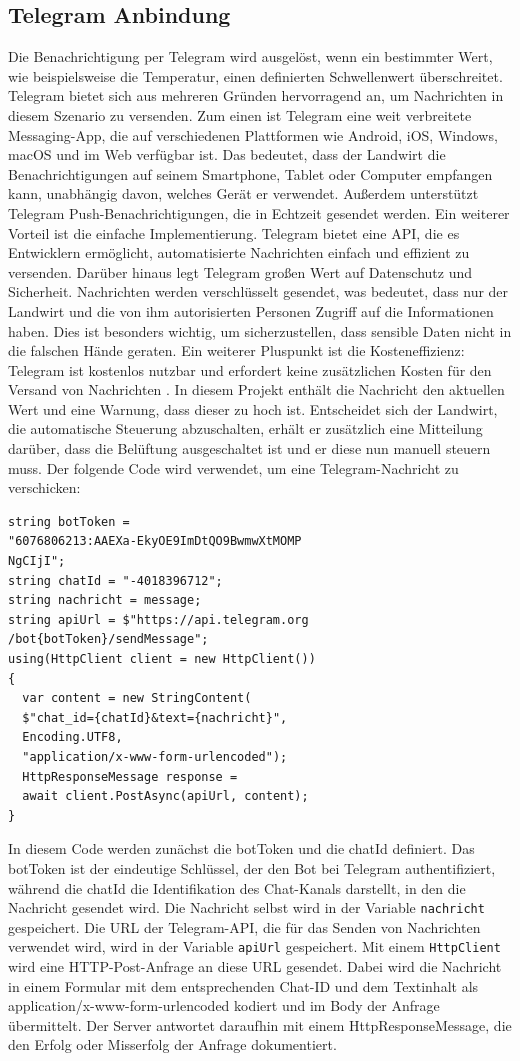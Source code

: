 \documentclass[conference]{IEEEtran}
\begin{document}
\subsection{Telegram Anbindung}
Die Benachrichtigung per Telegram wird ausgelöst, wenn ein bestimmter Wert, wie beispielsweise die Temperatur, einen definierten Schwellenwert überschreitet. Telegram bietet sich aus mehreren Gründen hervorragend an, um Nachrichten in diesem Szenario zu versenden. Zum einen ist Telegram eine weit verbreitete Messaging-App, die auf verschiedenen Plattformen wie Android, iOS, Windows, macOS und im Web verfügbar ist. Das bedeutet, dass der Landwirt die Benachrichtigungen auf seinem Smartphone, Tablet oder Computer empfangen kann, unabhängig davon, welches Gerät er verwendet. Außerdem unterstützt Telegram Push-Benachrichtigungen, die in Echtzeit gesendet werden. Ein weiterer Vorteil ist die einfache Implementierung. Telegram bietet eine API,  die es Entwicklern ermöglicht, automatisierte Nachrichten einfach und effizient zu versenden. Darüber hinaus legt Telegram großen Wert auf Datenschutz und Sicherheit. Nachrichten werden verschlüsselt gesendet, was bedeutet, dass nur der Landwirt und die von ihm autorisierten Personen Zugriff auf die Informationen haben. Dies ist besonders wichtig, um sicherzustellen, dass sensible Daten nicht in die falschen Hände geraten. Ein weiterer Pluspunkt ist die Kosteneffizienz: Telegram ist kostenlos nutzbar und erfordert keine zusätzlichen Kosten für den Versand von Nachrichten \cite{telegram}.
In diesem Projekt enthält die Nachricht den aktuellen Wert und eine Warnung, dass dieser zu hoch ist. Entscheidet sich der Landwirt, die automatische Steuerung abzuschalten, erhält er zusätzlich eine Mitteilung darüber, dass die Belüftung ausgeschaltet ist und er diese nun manuell steuern muss.
Der folgende Code wird verwendet, um eine Telegram-Nachricht zu verschicken:
\begin{verbatim}
string botToken = 
"6076806213:AAEXa-EkyOE9ImDtQO9BwmwXtMOMP
NgCIjI";
string chatId = "-4018396712";
string nachricht = message;
string apiUrl = $"https://api.telegram.org
/bot{botToken}/sendMessage";
using(HttpClient client = new HttpClient())
{
  var content = new StringContent(
  $"chat_id={chatId}&text={nachricht}", 
  Encoding.UTF8, 
  "application/x-www-form-urlencoded");
  HttpResponseMessage response = 
  await client.PostAsync(apiUrl, content);
}
\end{verbatim}
In diesem Code werden zunächst die botToken und die chatId definiert. Das botToken ist der eindeutige Schlüssel, der den Bot bei Telegram authentifiziert, während die chatId die Identifikation des Chat-Kanals darstellt, in den die Nachricht gesendet wird. Die Nachricht selbst wird in der Variable \texttt{nachricht} gespeichert.
Die URL der Telegram-API, die für das Senden von Nachrichten verwendet wird, wird in der Variable \texttt{apiUrl} gespeichert. Mit einem \texttt{HttpClient} wird eine HTTP-Post-Anfrage an diese URL gesendet. Dabei wird die Nachricht in einem Formular mit dem entsprechenden Chat-ID und dem Textinhalt als application/x-www-form-urlencoded kodiert und im Body der Anfrage übermittelt. Der Server antwortet daraufhin mit einem HttpResponseMessage, die den Erfolg oder Misserfolg der Anfrage dokumentiert.
\end{document}
